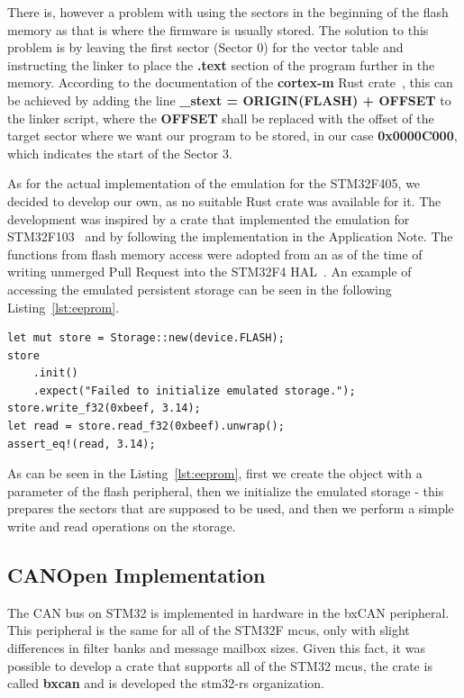 There is, however a problem with using the sectors in the beginning of the flash memory as that is where the firmware is usually stored.
The solution to this problem is by leaving the first sector (Sector 0) for the vector table and instructing the linker to place the \textbf{.text} section of the program further in the memory.
According to the documentation of the \textbf{cortex-m} Rust crate~\cite{rust_embedded_devices_wg_rust-embeddedcortex-m_2021}, this can be achieved by adding the line \textbf{\_stext = ORIGIN(FLASH) + OFFSET} to the linker script, where the \textbf{OFFSET} shall be replaced with the offset of the target sector where we want our program to be stored, in our case \textbf{0x0000C000}, which indicates the start of the Sector 3.

As for the actual implementation of the emulation for the STM32F405, we decided to develop our own, as no suitable Rust crate was available for it.
The development was inspired by a crate that implemented the emulation for STM32F103~\cite{dubrov_idubroveeprom_2020} and by following the implementation in the Application Note.
The functions from flash memory access were adopted from an as of the time of writing unmerged Pull Request into the STM32F4 HAL~\cite{astro_implement_2020}.
An example of accessing the emulated persistent storage can be seen in the following Listing~\ref{lst:eeprom}.

\newpage
\begin{lstlisting}[caption={An example use of the emulated persistent storage.},label=lst:eeprom]
let mut store = Storage::new(device.FLASH);
store
    .init()
    .expect("Failed to initialize emulated storage.");
store.write_f32(0xbeef, 3.14);
let read = store.read_f32(0xbeef).unwrap();
assert_eq!(read, 3.14);
\end{lstlisting}

As can be seen in the Listing~\ref{lst:eeprom}, first we create the object with a parameter of the flash peripheral, then we initialize the emulated storage - this prepares the sectors that are supposed to be used, and then we perform a simple write and read operations on the storage.

\subsection{CANOpen Implementation}
\label{subsec:canopen_impl}
The CAN bus on STM32 is implemented in hardware in the bxCAN peripheral.
This peripheral is the same for all of the STM32F \acs{mcu}s, only with slight differences in filter banks and message mailbox sizes.
Given this fact, it was possible to develop a crate that supports all of the STM32 \acs{mcu}s, the crate is called \textbf{bxcan} and is developed the stm32-rs organization.

